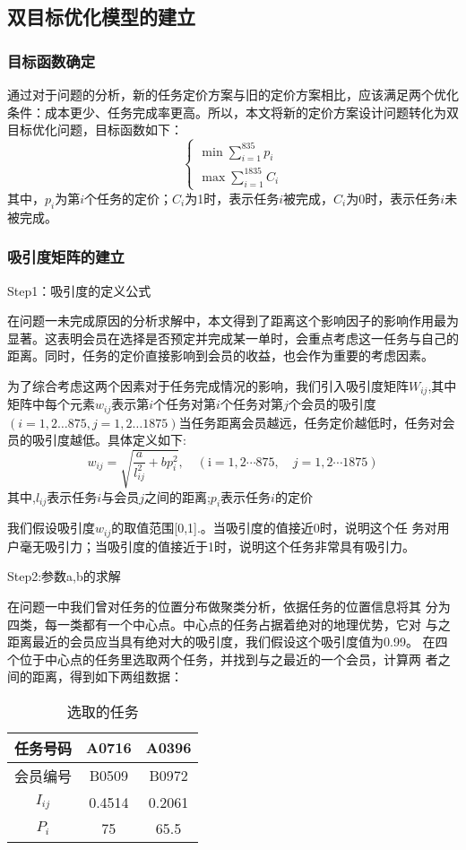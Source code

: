 \subsection{双目标优化模型的建立}
\subsubsection{目标函数确定}
通过对于问题的分析，新的任务定价方案与旧的定价方案相比，应该满足两个优化条件：成本更少、任务完成率更高。所以，本文将新的定价方案设计问题转化为双目标优化问题，目标函数如下：$$\left\{\begin{array}{l}
        \min \sum_{i=1}^{835} p_{i} \\
        \max \sum_{i=1}^{1835} C_{i}
    \end{array}\right.$$
其中，$p_i$为第$i$个任务的定价；$C_i$为1时，表示任务$i$被完成，$C_i$为0时，表示任务$i$未被完成。
\subsubsection{吸引度矩阵的建立}
Step1：吸引度的定义公式

在问题一未完成原因的分析求解中，本文得到了距离这个影响因子的影响作用最为显著。这表明会员在选择是否预定并完成某一单时，会重点考虑这一任务与自己的距离。同时，任务的定价直接影响到会员的收益，也会作为重要的考虑因素。

为了综合考虑这两个因素对于任务完成情况的影响，我们引入吸引度矩阵$W_{ij}$,其中矩阵中每个元素$w_{ij}$表示第$i$个任务对第$i$个任务对第$j$个会员的吸引度$(i=1,2\ldots 875,j=1,2\ldots 1875)$当任务距离会员越远，任务定价越低时，任务对会员的吸引度越低。具体定义如下:
$$w_{i j}=\sqrt{\frac{a}{l_{i j}^{2}}+b p_{i}^{2}}, \quad(\mathrm{i}=1,2 \cdots 875, \quad j=1,2 \cdots 1875)$$
其中,$l_{ij}$表示任务$i$与会员$j$之间的距离;$p_i$表示任务$i$的定价

我们假设吸引度$w_{ij}$的取值范围[0,1].。当吸引度的值接近0时，说明这个任
务对用户毫无吸引力；当吸引度的值接近于1时，说明这个任务非常具有吸引力。

Step2:参数a,b的求解

在问题一中我们曾对任务的位置分布做聚类分析，依据任务的位置信息将其
分为四类，每一类都有一个中心点。中心点的任务占据着绝对的地理优势，它对
与之距离最近的会员应当具有绝对大的吸引度，我们假设这个吸引度值为0.99。
在四个位于中心点的任务里选取两个任务，并找到与之最近的一个会员，计算两
者之间的距离，得到如下两组数据：
\begin{longtable}[c]{c|cc}
    \caption{选取的任务}
    \label{tab:my-table}       \\
    \hline
    任务号码 & A0716  & A0396  \\
    \endfirsthead
    \endhead
    \hline
    \endfoot
    \endlastfoot
    会员编号 & B0509  & B0972  \\
    $I_{ij}$ & 0.4514 & 0.2061 \\
    $P_i$    & 75     & 65.5   \\ \hline
\end{longtable}

